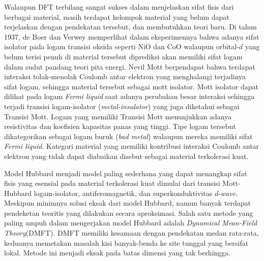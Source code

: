 Walaupun DFT terbilang sangat sukses dalam menjelaskan sifat fisis dari berbagai material, masih terdapat kelompok material yang belum dapat terjelaskan dengan pendekatan tersebut, dan membutuhkan teori baru. Di tahun 1937, de Boer dan Verwey\cite{boer} memperlihat dalam eksperimennya bahwa adanya sifat isolator pada logam transisi oksida seperti NiO dan CoO walaupun orbital-$d$ yang belum terisi penuh di material tersebut diprediksi akan memiliki sifat logam dalam sudut pandang teori pita energi. Nevil Mott\cite{mott} berpendapat bahwa terdapat interaksi tolak-menolak Coulomb antar elektron yang menghalangi terjadinya sifat logam, sehingga material tersebut sebagai mott isolator. Mott isolator dapat dilihat pada logam \textit{Fermi liquid} saat adanya perubahan besar interaksi sehingga terjadi transisi logam-isolator (\textit{metal-insulator}) yang juga diketahui sebagai Transisi Mott. Logam yang memiliki Transisi Mott menunjukkan adanya resistivitas dan koefisien kapasitas panas yang tinggi. Tipe logam tersebut dikategorikan sebagai logam buruk (\textit{bad metal}) walaupun mereka memiliki sifat \textit{Fermi liquid}. Kategori material yang memiliki kontribusi interaksi Coulomb antar elektron yang tidak dapat diabaikan disebut sebagai material terkolerasi kuat.

Model Hubbard menjadi model paling sederhana yang dapat menangkap sifat fisis yang esensial pada material terkolerasi kuat dimulai dari transisi Mott-Hubbard logam-isolator\cite{mott-hubbard}, antiferomagnetik\cite{antiferomagnetik1}, dan superkonduktivitas $d$-\textit{wave}\cite{d-wave}. Meskipun minimnya solusi eksak dari model Hubbard, namun banyak terdapat pendeketan teoritis yang dilakukan secara aproksimasi. Salah satu metode yang paling ampuh dalam mengerjakan model Hubbard adalah \textit{Dynamical Mean-Field Theory}(DMFT)\cite{DMFT}. DMFT memiliki kesamaan dengan pendekatan medan rata-rata, keduanya memetakan masalah kisi banyak-benda ke site tunggal yang bersifat lokal. Metode ini menjadi eksak pada batas dimensi yang tak berhingga. 


